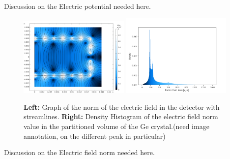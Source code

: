 {\color{blue} Discussion on the Electric potential needed here.}

\begin{figure}
\centering
\includegraphics[width=0.48\textwidth]{Figures/Electrodes/electric_field_norm.png}
\includegraphics[width=0.48\textwidth]{Figures/Electrodes/hist_enorm.png}
\caption{
\textbf{Left:} Graph of the norm of the electric field in the detector with streamlines.
\textbf{Right:} Density Histogram of the electric field norm value in the partitioned volume of the Ge crystal.(need image annotation, on the different peak in particular)
}
\label{fig:fid38-enorm}
\end{figure}

{\color{blue} Discussion on the Electric field norm needed here.}

